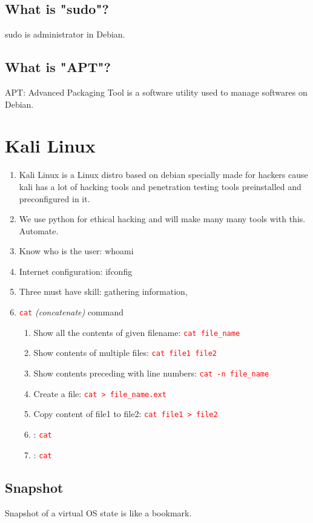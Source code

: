 \documentclass[12 pt, letterpaper]{extarticle}
\newcommand{\R}{\textcolor{red}} %
\newcommand{\T}{\texttt}
\begin{document}
\subsection*{What is "sudo"?}
sudo is administrator in Debian.

\subsection*{What is "APT"?}
APT: Advanced Packaging Tool is a software utility used to manage softwares on Debian.


\section*{Kali Linux}
\begin{enumerate}
	\item Kali Linux is a Linux distro based on debian specially made for hackers cause kali has a lot of hacking tools and penetration testing tools preinstalled and preconfigured in it.
	\item We use python for ethical hacking and will make many many tools with this. Automate.
	\item Know who is the user: whoami
	\item Internet configuration: ifconfig
	\item Three must have skill: gathering information,

	\item \R{\T{cat}} \textit{(concatenate)} command
	      \begin{enumerate}
		      \item Show all the contents of given  filename: \R{\T{cat file\_name}}
		      \item Show contents of multiple files: \R{\T{cat file1 file2}}
		      \item Show contents preceding with line numbers: \R{\T{cat -n file\_name}}
		      \item Create a file: \R{\T{cat > file\_name.ext}}
		      \item Copy content of file1 to file2: \R{\T{cat file1 > file2}}
		      \item : \R{\T{cat }}
		      \item : \R{\T{cat }}
	      \end{enumerate}
\end{enumerate}

\subsection{Snapshot}
Snapshot of a virtual OS state is like a bookmark.
\end{document}
